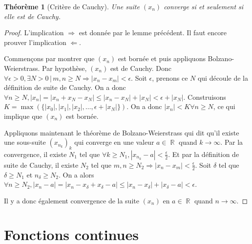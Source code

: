 \documentclass{article}
\DeclareMathOperator{\R}{\mathbb R}
\newtheorem{thm}{Théorème}[section]
\theoremstyle{definition}
\theoremstyle{remark}
\begin{document}
		\begin{thm}[Critère de Cauchy] Une suite $(x_n)$ converge si et seulement si elle est de Cauchy. \end{thm}

		\begin{proof} L'implication $\Rightarrow$ est donnée par le lemme précédent. Il faut encore prouver l'implication $\Leftarrow$.

		Commençons par montrer que $(x_n)$ est bornée et puis appliquons Bolzano-Weierstrass. Par hypothèse, $(x_n)$ est de Cauchy. Donc $\forall \epsilon > 0,
		\exists N > 0 \, | \, m, n \geq N \Rightarrow |x_n - x_m| < \epsilon$. Soit $\epsilon$, prenons ce $N$ qui découle de la définition de suite de Cauchy.
		On a donc $\forall n \geq N, |x_n| = |x_n + x_N - x_N| \leq |x_n - x_N| + |x_N| < \epsilon + |x_N|$. Construisons $K = \max(\{|x_0|, |x_1|, |x_2|, \ldots,
		\epsilon + |x_N|\})$. On a donc $|x_n| < K \forall n \geq N$, ce qui implique que $(x_n)$ est bornée.

		Appliquons maintenant le théorème de Bolzano-Weierstrass qui dit qu'il existe une sous-suite $(x_{n_k})_k$ qui converge en une valeur $a \in \R$ quand
		$k \to \infty$. Par la convergence, il existe $N_1$ tel que $\forall k \geq N_1, |x_{n_k} - a| < \frac \epsilon2$. Et par la définition de suite de Cauchy,
		il existe $N_2$ tel que $m, n \geq N_2 \Rightarrow |x_n - x_m| < \frac \epsilon2$. Soit $\delta$ tel que $\delta \geq N_1$ et $n_\delta \geq N_2$.
		On a alors $\forall n \geq N_2, |x_n - a| = |x_n - x_\delta + x_\delta - a| \leq |x_n - x_\delta| + |x_\delta - a| < \epsilon$.

		Il y a donc également convergence de la suite $(x_n)$ en $a \in \R$ quand $n \to \infty$. \end{proof}

\newpage
\section{Fonctions continues}
\end{document}
